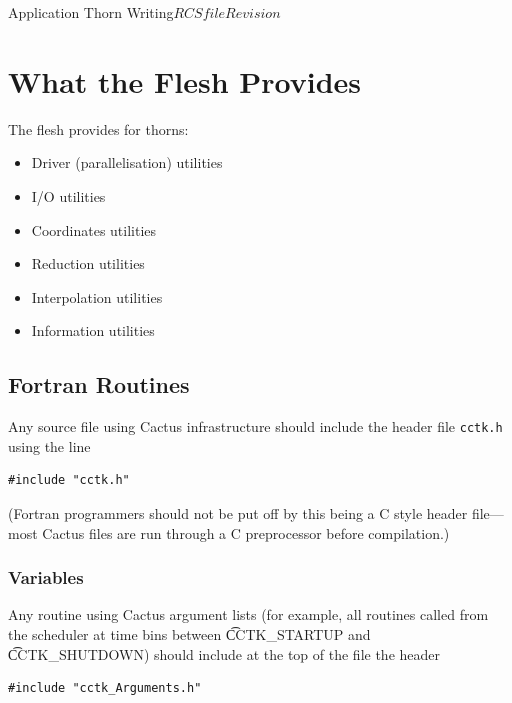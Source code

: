 \begin{cactuspart}{Application Thorn Writing}{$RCSfile$}{$Revision$}

\section{What the Flesh Provides}

The flesh provides for thorns:
\begin{Lentry}
\item [\texttt{Variables}]
\item [\texttt{Parameters}]
\item [\texttt{Cactus Functions}]

\begin{itemize}
  \item{} Driver (parallelisation) utilities
  \item{} I/O utilities
  \item{} Coordinates utilities
  \item{} Reduction utilities
  \item{} Interpolation utilities
  \item{} Information utilities
\end{itemize}
\end{Lentry}


\subsection{Fortran Routines}

Any source file using Cactus infrastructure should include
the header file \texttt{cctk.h} using the line
\begin{verbatim}
#include "cctk.h"
\end{verbatim}
(Fortran programmers should not be put off by this being a C style
header file---most Cactus files are run through a C preprocessor
before compilation.)

\subsubsection{Variables}

Any routine using Cactus argument lists (for example, all routines called from
the scheduler at time bins between {\t CCTK\_STARTUP} and {\t CCTK\_SHUTDOWN})
should include at the top of the file the header
\begin{verbatim}
#include "cctk_Arguments.h"
\end{verbatim}


\end{cactuspart}
